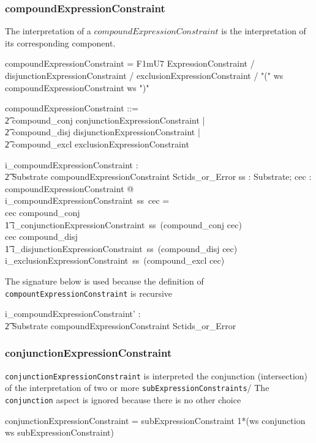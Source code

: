 \documentclass{article}
\def\spec#1{{\tt #1}}
\def\bnf#1{{\scriptsize {{#1}} }}
\begin{document}
\subsubsection{compoundExpressionConstraint}
The interpretation of a $compoundExpressionConstraint$ is the interpretation of its corresponding component.
\begin{framed}
\noindent
\bnf{compoundExpressionConstraint = F1mU7
ExpressionConstraint / 
	disjunctionExpressionConstraint / exclusionExpressionConstraint / 
	"(" ws compoundExpressionConstraint ws ")"}
\end{framed}

\begin{zed}
compoundExpressionConstraint ::= \\
\t2 compound\_conj \ldata conjunctionExpressionConstraint \rdata | \\
\t2 compound\_disj \ldata disjunctionExpressionConstraint \rdata | \\
\t2 compound\_excl \ldata exclusionExpressionConstraint \rdata 
\end{zed}

\begin{gendef}
   i\_compoundExpressionConstraint : \\
\t2 Substrate \fun compoundExpressionConstraint \fun Sctids\_or\_Error
\where
  \forall ss : Substrate; cec : compoundExpressionConstraint @ \\
 i\_compoundExpressionConstraint~ss~cec = \\
   \IF cec \in \ran compound\_conj \\
\t1 \THEN i\_conjunctionExpressionConstraint~ss~(compound\_conj \inv cec) \\
    \ELSE \IF cec \in\ran compound\_disj \\
\t1 \THEN i\_disjunctionExpressionConstraint~ss~(compound\_disj \inv cec) \\
    \ELSE i\_exclusionExpressionConstraint~ss~(compound\_excl \inv cec) 
\end{gendef}

The signature below is used because the definition of \spec{compountExpressionConstraint} is recursive
\begin{gendef}
   i\_compoundExpressionConstraint' : \\
\t2 Substrate \fun compoundExpressionConstraint \fun Sctids\_or\_Error
\end{gendef}


\subsubsection{conjunctionExpressionConstraint}
\spec{conjunctionExpressionConstraint} is interpreted the conjunction (intersection) of the interpretation of two or more
\spec{subExpressionConstraints}/  The \spec{conjunction} aspect is ignored because there is no other choice
\begin{framed}
\noindent
\bnf{conjunctionExpressionConstraint = subExpressionConstraint 1*(ws conjunction ws subExpressionConstraint)}
\end{framed}
\end{document}
